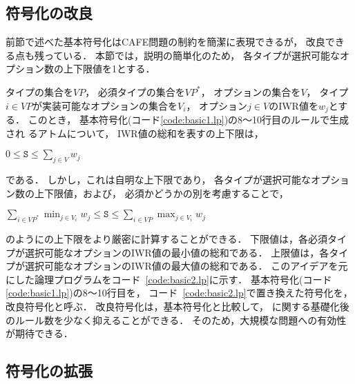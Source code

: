 \subsection{符号化の改良}

 

前節で述べた基本符号化はCAFE問題の制約を簡潔に表現できるが，
改良できる点も残っている．
本節では，説明の簡単化のため，
各タイプが選択可能なオプション数の上下限値を1とする．

タイプの集合を$VP$，
必須タイプの集合を$VP^{*}$，
オプションの集合を$V$，
タイプ$i\in VP$が実装可能なオプションの集合を$V_{i}$，
オプション$j\in V$のIWR値を$w_{j}$とする．
このとき，
基本符号化(コード\ref{code:basic1.lp})の8〜10行目のルールで生成され
るアトムについて，
IWR値の総和を表すの上下限は，
\begin{center}
\(0 \leq \texttt{S} \leq \sum_{j\in V}w_{j}\)
\end{center}
である．
しかし，これは自明な上下限であり，
各タイプが選択可能なオプション数の上下限値，および，
必須かどうかの別を考慮することで，
\begin{center}
\(
\sum_{i\in VP^{*}}\min_{j\in V_{i}}w_{j}
\leq \texttt{S} \leq
\sum_{i\in VP}\max_{j\in V_{i}}w_{j}
\)
\end{center}
のようにの上下限をより厳密に計算することができる．
下限値は，各必須タイプが選択可能なオプションのIWR値の最小値の総和である．
上限値は，各タイプが選択可能なオプションのIWR値の最大値の総和である．
このアイデアを元にした論理プログラムをコード~\ref{code:basic2.lp}に示す．
基本符号化(コード\ref{code:basic1.lp})の8〜10行目を，
コード~\ref{code:basic2.lp}で置き換えた符号化を，
改良符号化と呼ぶ．
改良符号化は，基本符号化と比較して，
に関する基礎化後のルール数を少なく抑えることができる．
そのため，大規模な問題への有効性が期待できる．

\subsection{符号化の拡張}

 

